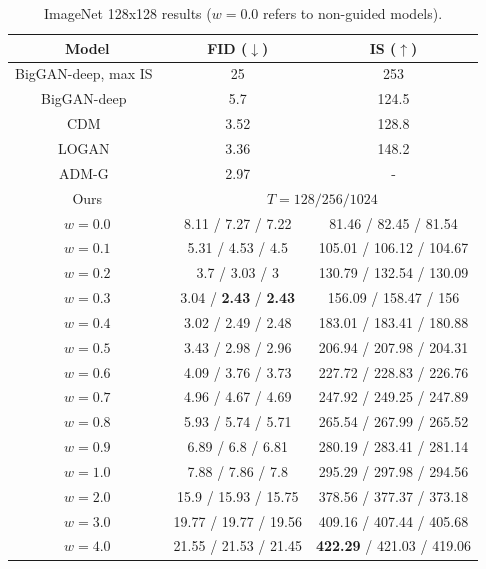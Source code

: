 \documentclass{article} %
\begin{document}
\begin{table}[!htb]
\centering\small
\begin{tabular}{c|c|c}
\toprule
Model & FID ($\downarrow$) & IS ($\uparrow$) \\
\midrule
BigGAN-deep, max IS~\citep{brock2018large} & 25 & 253 \\
BigGAN-deep~\citep{brock2018large} & 5.7 & 124.5 \\
CDM~\citep{ho2021cascaded} & 3.52 & 128.8 \\
LOGAN~\citep{wu2019logan} & 3.36 & 148.2 \\
ADM-G~\citep{dhariwal2021diffusion} & 2.97 & - \\
\midrule
Ours & \multicolumn{2}{c}{$T=128/256/1024$} \\
$w=0.0$  & 8.11 / 7.27 / 7.22    &    81.46 / 82.45 / 81.54 \\
$w=0.1$  & 5.31 / 4.53 / 4.5    &    105.01 / 106.12 / 104.67 \\
$w=0.2$  & 3.7 / 3.03 / 3    &    130.79 / 132.54 / 130.09 \\
$w=0.3$  & 3.04 / \textbf{2.43} / \textbf{2.43}    &    156.09 / 158.47 / 156 \\
$w=0.4$  & 3.02 / 2.49 / 2.48    &    183.01 / 183.41 / 180.88 \\
$w=0.5$  & 3.43 / 2.98 / 2.96    &    206.94 / 207.98 / 204.31 \\
$w=0.6$  & 4.09 / 3.76 / 3.73    &    227.72 / 228.83 / 226.76 \\
$w=0.7$  & 4.96 / 4.67 / 4.69    &    247.92 / 249.25 / 247.89 \\
$w=0.8$  & 5.93 / 5.74 / 5.71    &    265.54 / 267.99 / 265.52 \\
$w=0.9$  & 6.89 / 6.8 / 6.81    &    280.19 / 283.41 / 281.14 \\
$w=1.0$  & 7.88 / 7.86 / 7.8    &    295.29 / 297.98 / 294.56 \\
$w=2.0$  & 15.9 / 15.93 / 15.75    &    378.56 / 377.37 / 373.18 \\
$w=3.0$  & 19.77 / 19.77 / 19.56    &    409.16 / 407.44 / 405.68 \\
$w=4.0$  & 21.55 / 21.53 / 21.45    &    \textbf{422.29} / 421.03 / 419.06 \\
\bottomrule
\end{tabular}
\caption{ImageNet 128x128 results ($w=0.0$ refers to non-guided models).}
\label{table:i128}
\end{table}
\end{document}
